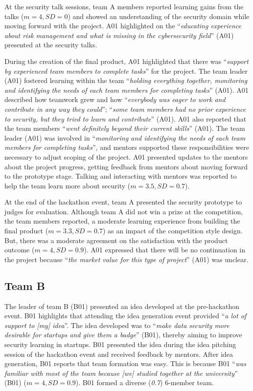 \documentclass[runningheads]{llncs}
\begin{document}
At the security talk sessions, team A members reported learning gains from the talks ($m = 4,SD=0$) and showed an understanding of the security domain while moving forward with the project. A01 highlighted on the ``\textit{educating experience about risk management and what is missing in the cybersecurity field}'' (A01) presented at the security talks.

During the creation of the final product, A01 highlighted that there was ``\textit{support by experienced team members to complete tasks}'' for the project. The team leader (A01) fostered learning within the team ``\textit{holding everything together, monitoring and identifying the needs of each team members for completing tasks}'' (A01). A01 described how teamwork grew and how ``\textit{everybody was eager to work and contribute in any way they could}''; ``\textit{some team members had no prior experience to security, but they tried to learn and contribute}'' (A01). A01 also reported that the team members ``\textit{went definitely beyond their current skills}'' (A01). The team leader (A01) was involved in  ``\textit{monitoring and identifying the needs of each team members for completing tasks}'', and mentors supported these responsibilities were necessary to adjust scoping of the project. A01 presented updates to the mentors about the project progress, getting feedback from mentors about moving forward to the prototype stage. Talking and interacting with mentors was reported to help the team learn more about security ($m = 3.5,SD=0.7$).

At the end of the hackathon event, team A presented the security prototype to judges for evaluation. Although team A did not win a prize at the competition, the team members reported, a moderate learning experience from building the final product ($m = 3.3,SD=0.7$) as an impact of the competition style design. But, there was a moderate agreement on the satisfaction with the product outcome ($m=4, SD=0.9$). A01 expressed that there will be no continuation in the project because ``\textit{the market value for this type of project}'' (A01) was unclear.%

\subsection{Team B}
The leader of team B (B01) presented an idea developed at the pre-hackathon event. B01 highlights that attending the idea generation event provided ``\textit{a lot of support to [my] idea}''. The idea developed was to ``\textit{make data security more desirable for startups and give them a badge}'' (B01), thereby aiming to improve security learning in startups. B01 presented the idea during the idea pitching session of the hackathon event and received feedback by mentors. 
After idea generation, B01 reports that team formation was easy. This is because B01 ``\textit{was familiar with most of the team because [we] studied together at the university}'' (B01) ($m=4, SD=0.9$). B01 formed a diverse (\textit{0.7}) 6-member team.
\end{document}

